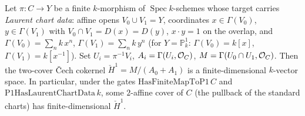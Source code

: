\begin{theorem}
  \label{mk-thm:adelic_finiteDimensional_cokernel_zero}
  \leanok

  Let \(\pi \colon C \to Y\) be a finite \(k\)-morphism of
  \(\operatorname{Spec} k\)-schemes whose target carries \emph{Laurent
  chart data}: affine opens \(V_0 \cup V_1 = Y\), coordinates
  \(x \in \Gamma(V_0)\), \(y \in \Gamma(V_1)\) with
  \(V_0 \cap V_1 = D(x) = D(y)\), \(x \cdot y = 1\) on the overlap, and
  \(\Gamma(V_0) = \sum_n k\, x^n\), \(\Gamma(V_1) = \sum_n k\, y^n\) (for
  \(Y = \mathbb{P}^1_k\): \(\Gamma(V_0) = k[x]\),
  \(\Gamma(V_1) = k[x^{-1}]\)). Set \(U_i = \pi^{-1} V_i\),
  \(A_i = \Gamma(U_i, \mathcal{O}_{C})\),
  \(M = \Gamma(U_0 \cap U_1, \mathcal{O}_{C})\). Then the two-cover Čech
  cokernel \(\check{H}^1 = M/(A_0 + A_1)\) is a finite-dimensional
  \(k\)-vector space. In particular, under the gates
  \(\mathrm{HasFiniteMapToP1}\, C\) and \(\mathrm{P1HasLaurentChartData}\,
  k\), some \(2\)-affine cover of \(C\) (the pullback of the standard
  charts) has finite-dimensional \(\check{H}^1\).
\end{theorem}
